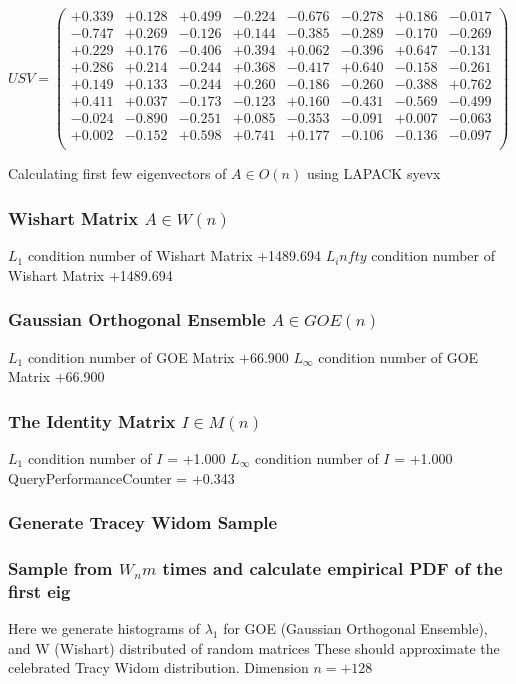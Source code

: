 \documentclass[9pt]{article}
\theoremstyle{plain}
\theoremstyle{definition}
\theoremstyle{remark}
\numberwithin{equation}{section}
\begin{document}
$U S V = \left(
\begin{array}{
cccccccc}
+0.339 & +0.128 & +0.499 & -0.224 & -0.676 & -0.278 & +0.186 & -0.017 \\
-0.747 & +0.269 & -0.126 & +0.144 & -0.385 & -0.289 & -0.170 & -0.269 \\
+0.229 & +0.176 & -0.406 & +0.394 & +0.062 & -0.396 & +0.647 & -0.131 \\
+0.286 & +0.214 & -0.244 & +0.368 & -0.417 & +0.640 & -0.158 & -0.261 \\
+0.149 & +0.133 & -0.244 & +0.260 & -0.186 & -0.260 & -0.388 & +0.762 \\
+0.411 & +0.037 & -0.173 & -0.123 & +0.160 & -0.431 & -0.569 & -0.499 \\
-0.024 & -0.890 & -0.251 & +0.085 & -0.353 & -0.091 & +0.007 & -0.063 \\
+0.002 & -0.152 & +0.598 & +0.741 & +0.177 & -0.106 & -0.136 & -0.097 \\
\end{array}
\right)$ \newline 

Calculating first few eigenvectors of $A \in O(n)$ using LAPACK syevx

\subsubsection{Wishart Matrix $A \in W(n)$}
$L_1$ condition number of Wishart Matrix +1489.694
$L_infty$ condition number of Wishart Matrix +1489.694
\subsubsection{Gaussian Orthogonal Ensemble $A \in GOE(n)$}
$L_1$ condition number of GOE Matrix +66.900
$L_\infty$ condition number of GOE Matrix +66.900
\subsubsection{The Identity Matrix $I \in M(n)$}
$L_1$ condition number of $I$ = +1.000
$L_\infty$ condition number of $I$ = +1.000
QueryPerformanceCounter  =  +0.343
\subsubsection{Generate Tracey Widom Sample}
\subsubsection{Sample from $W_n m$ times and calculate empirical PDF of the first eig}
Here we generate histograms of $\lambda_1$ for GOE (Gaussian Orthogonal Ensemble), and W (Wishart) 		 distributed of random matrices
These should approximate the celebrated Tracy Widom distribution.
Dimension $n = +128$
\end{document}
